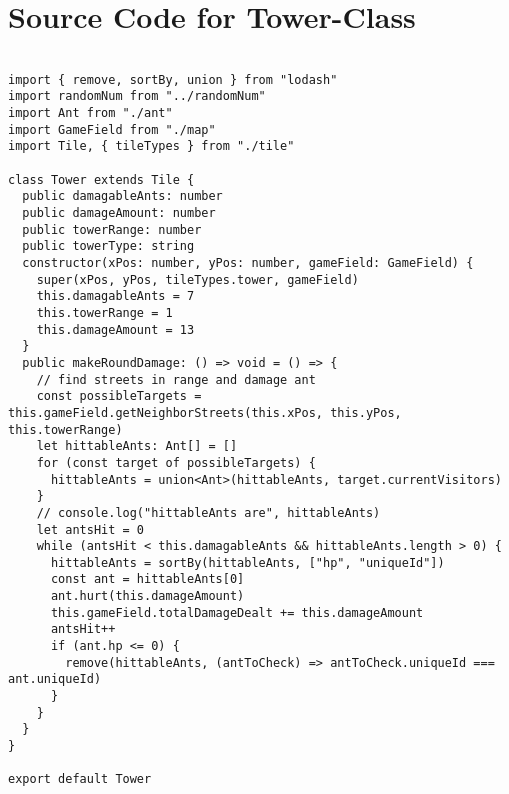 \section{Source Code for Tower-Class}
\label{src:logictower}
\begin{lstlisting}

import { remove, sortBy, union } from "lodash"
import randomNum from "../randomNum"
import Ant from "./ant"
import GameField from "./map"
import Tile, { tileTypes } from "./tile"

class Tower extends Tile {
  public damagableAnts: number
  public damageAmount: number
  public towerRange: number
  public towerType: string
  constructor(xPos: number, yPos: number, gameField: GameField) {
    super(xPos, yPos, tileTypes.tower, gameField)
    this.damagableAnts = 7
    this.towerRange = 1
    this.damageAmount = 13
  }
  public makeRoundDamage: () => void = () => {
    // find streets in range and damage ant
    const possibleTargets = this.gameField.getNeighborStreets(this.xPos, this.yPos, this.towerRange)
    let hittableAnts: Ant[] = []
    for (const target of possibleTargets) {
      hittableAnts = union<Ant>(hittableAnts, target.currentVisitors)
    }
    // console.log("hittableAnts are", hittableAnts)
    let antsHit = 0
    while (antsHit < this.damagableAnts && hittableAnts.length > 0) {
      hittableAnts = sortBy(hittableAnts, ["hp", "uniqueId"])
      const ant = hittableAnts[0]
      ant.hurt(this.damageAmount)
      this.gameField.totalDamageDealt += this.damageAmount
      antsHit++
      if (ant.hp <= 0) {
        remove(hittableAnts, (antToCheck) => antToCheck.uniqueId === ant.uniqueId)
      }
    }
  }
}

export default Tower

\end{lstlisting}

